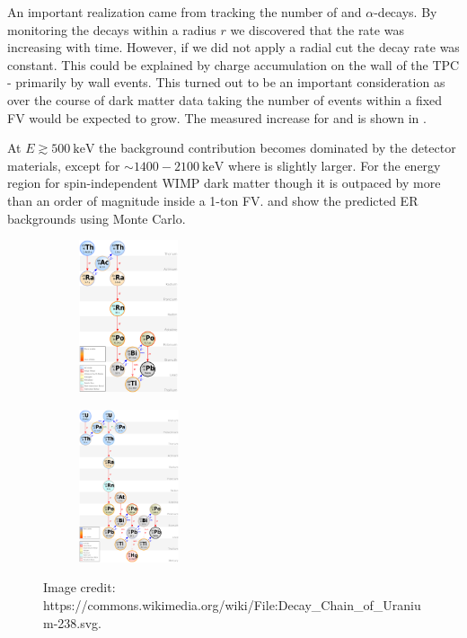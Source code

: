 An important realization came from tracking the number of  and  $\alpha$-decays.  By monitoring the
decays within a radius $r$ we discovered that the rate was increasing with time.  However, if we did not apply a radial cut the decay rate
was constant.  This could be explained by charge accumulation on the wall of the TPC - primarily by wall events.  This turned out to be an
important consideration as over the course of dark matter data taking the number of events within a fixed FV would be expected to
grow.  The measured increase for  and  is shown in .


At $E \gtrsim 500\ \mathrm{keV}$ the background contribution becomes dominated by the detector materials, except for
${\sim} 1400-2100\ \mathrm{keV}$ where  is slightly larger.  For the energy region for spin-independent WIMP dark matter
though it is outpaced by more than an order of magnitude inside a 1-ton FV.   and
 show the predicted ER backgrounds using Monte Carlo.

\begin{figure}
    \centering
    \begin{subfigure}[t]{0.45\textwidth}
        \centering
        \includegraphics[height=4.5cm]{Decay_Chain_of_Thorium-232}
    \end{subfigure}%
    \begin{subfigure}[t]{0.45\textwidth}
        \centering
        \includegraphics[height=4.5cm]{Decay_Chain_of_Uranium-238}
    \end{subfigure}
    \caption{Image credit: https://commons.wikimedia.org/wiki/File:Decay_Chain_of_Uranium-238.svg.}
	\label{fig:backgrounds_decay_chains}
\end{figure}

